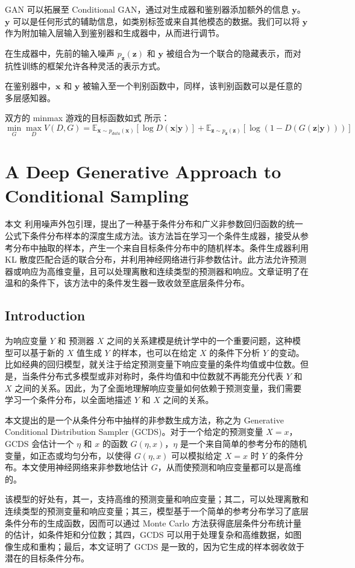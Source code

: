 \documentclass{myarticle}
\begin{document}
    GAN 可以拓展至 Conditional GAN，通过对生成器和鉴别器添加额外的信息 $\boldsymbol{y}$。$\boldsymbol{y}$ 可以是任何形式的辅助信息，如类别标签或来自其他模态的数据。我们可以将 $\boldsymbol{y}$ 作为附加输入层输入到鉴别器和生成器中，从而进行调节。

    在生成器中，先前的输入噪声 $p_{\boldsymbol{z}}(\boldsymbol{z})$ 和 $\boldsymbol{y}$ 被组合为一个联合的隐藏表示，而对抗性训练的框架允许各种灵活的表示方式。

    在鉴别器中，$\boldsymbol{x}$ 和 $\boldsymbol{y}$ 被输入至一个判别函数中，同样，该判别函数可以是任意的多层感知器。

    双方的 minmax 游戏的目标函数如式 所示：
    \begin{equation}
        \min_{G}\max_{D}V(D,G)=\mathbb{E}_{\boldsymbol{x}\sim p_{data}(\boldsymbol{x})}[\log D(\boldsymbol{x}|\boldsymbol{y})]+\mathbb{E}_{\boldsymbol{z}\sim p_{\boldsymbol{z}}(\boldsymbol{z})}[\log(1-D(G(\boldsymbol{z}|\boldsymbol{y})))]
        \label{cGAN objective function}
    \end{equation}

    \section{A Deep Generative Approach to Conditional Sampling}

    本文 \cite{Zhou_Jiao_2022} 利用噪声外包引理，提出了一种基于条件分布和广义非参数回归函数的统一公式下条件分布样本的深度生成方法。该方法旨在学习一个条件生成器，接受从参考分布中抽取的样本，产生一个来自目标条件分布中的随机样本。条件生成器利用 KL 散度匹配合适的联合分布，并利用神经网络进行非参数估计。此方法允许预测器或响应为高维变量，且可以处理离散和连续类型的预测器和响应。文章证明了在温和的条件下，该方法中的条件发生器一致收敛至底层条件分布。

    \subsection{Introduction}

    为响应变量 $Y$ 和 预测器 $X$ 之间的关系建模是统计学中的一个重要问题，这种模型可以基于新的 $X$ 值生成 $Y$ 的样本，也可以在给定 $X$ 的条件下分析 $Y$ 的变动。比如经典的回归模型，就关注于给定预测变量下响应变量的条件均值或中位数。但是，当条件分布式多模型或非对称时，条件均值和中位数就不再能充分代表 $Y$ 和 $X$ 之间的关系。因此，为了全面地理解响应变量如何依赖于预测变量，我们需要学习一个条件分布，以全面地描述 $Y$ 和 $X$ 之间的关系。

    本文提出的是一个从条件分布中抽样的非参数生成方法，称之为 Generative Conditional Distribution Sampler (GCDS)。对于一个给定的预测变量 $X=x$，GCDS 会估计一个 $\eta$ 和 $x$ 的函数 $G(\eta,x)$，$\eta$ 是一个来自简单的参考分布的随机变量，如正态或均匀分布，以使得 $G(\eta,x)$ 可以模拟给定 $X=x$ 时 $Y$ 的条件分布。本文使用神经网络来非参数地估计 $G$，从而使预测和响应变量都可以是高维的。

    该模型的好处有，其一，支持高维的预测变量和响应变量；其二，可以处理离散和连续类型的预测变量和响应变量；其三，模型基于一个简单的参考分布学习了底层条件分布的生成函数，因而可以通过 Monte Carlo 方法获得底层条件分布统计量的估计，如条件矩和分位数；其四，GCDS 可以用于处理复杂和高维数据，如图像生成和重构；最后，本文证明了 GCDS 是一致的，因为它生成的样本弱收敛于潜在的目标条件分布。

    \clearpage
    
    
\end{document}
